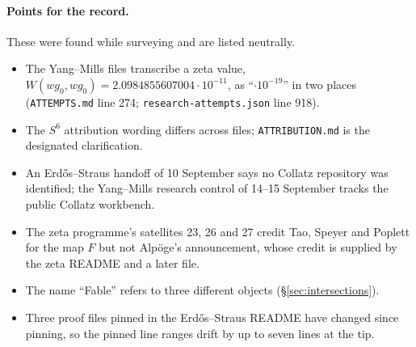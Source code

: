 \paragraph{Points for the record.} These were found while surveying and are listed neutrally.
\begin{itemize}
\item The Yang--Mills files transcribe a zeta value, $W(wg_0,wg_0)=2.0984855607004\cdot10^{-11}$, as ``$\cdot10^{-19}$'' in two places (\texttt{ATTEMPTS.md} line 274; \texttt{research-attempts.json} line 918).
\item The $S^6$ attribution wording differs across files; \texttt{ATTRIBUTION.md} is the designated clarification.
\item An Erdős--Straus handoff of 10 September says no Collatz repository was identified; the Yang--Mills research control of 14--15 September tracks the public Collatz workbench.
\item The zeta programme's satellites 23, 26 and 27 credit Tao, Speyer and Poplett for the map $F$ but not Alpöge's announcement, whose credit is supplied by the zeta README and a later file.
\item The name ``Fable'' refers to three different objects (§\ref{sec:intersections}).
\item Three proof files pinned in the Erdős--Straus README have changed since pinning, so the pinned line ranges drift by up to seven lines at the tip.
\end{itemize}

